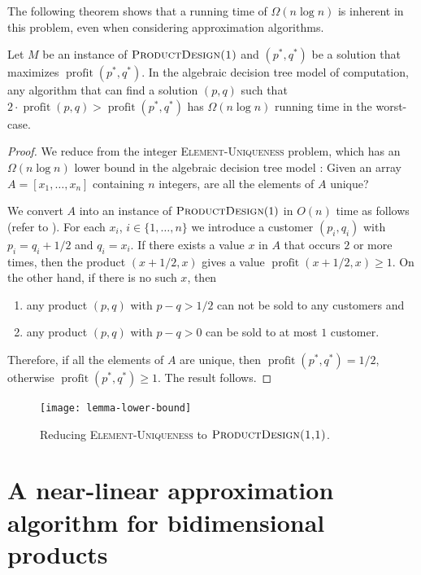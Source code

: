 \documentclass[lotsofwhite]{patmorin}
\newcommand{\val}{\operatorname{profit}}
\begin{document}
The following theorem shows that a running time of $\Omega(n\log n)$
is inherent in this problem, even when considering approximation
algorithms.

\begin{thm}
  Let $M$ be an instance of $\textsc{ProductDesign(1)}$ and $(p^*,q^*)$
  be a solution that maximizes $\val(p^*,q^*)$.  In the algebraic decision
  tree model of computation, any algorithm that can find a solution
  $(p,q)$ such that $2\cdot\val(p,q) > \val(p^*,q^*)$ has $\Omega(n\log n)$
  running time in the worst-case.
\end{thm}

\begin{proof}
  We reduce from the integer \textsc{Element-Uniqueness} problem, which
  has an $\Omega(n\log n)$ lower bound in the algebraic decision tree
  model \cite{y91}: Given an array $A=[x_1,\ldots,x_n]$ containing
  $n$ integers, are all the elements of $A$ unique?

  We convert $A$ into an instance of $\textsc{ProductDesign}(1)$ in
  $O(n)$ time as follows (refer to ).  For each
  $x_i$, $i\in\{1,\ldots,n\}$ we introduce a customer $(p_i,q_i)$ with
  $p_i=q_i+1/2$ and $q_i=x_i$.  If there exists a value $x$ in $A$ that
  occurs $2$ or more times, then the product $(x+1/2,x)$ gives a value
  $\val(x+1/2,x) \ge 1$.  On the other hand, if there is no such $x$,
  then 
  \begin{enumerate} 
    \item any product $(p,q)$ with $p-q>1/2$ can not be sold to any
    customers and
    \item any product $(p,q)$ with $p-q>0$ can be sold to at most $1$
    customer.
  \end{enumerate} 
  Therefore, if all the elements of $A$ are unique, then $\val(p^*,q^*)
  = 1/2$, otherwise $\val(p^*,q^*) \ge 1$.  The result follows.
\end{proof}

\begin{figure}
  \begin{center}
    \texttt{[image: lemma-lower-bound]}
  \end{center}
  \caption{Reducing \textsc{Element-Uniqueness} to
           $\textsc{ProductDesign(1,1)}$.}
\end{figure}

\section{A near-linear approximation algorithm for bidimensional products}
\end{document}
